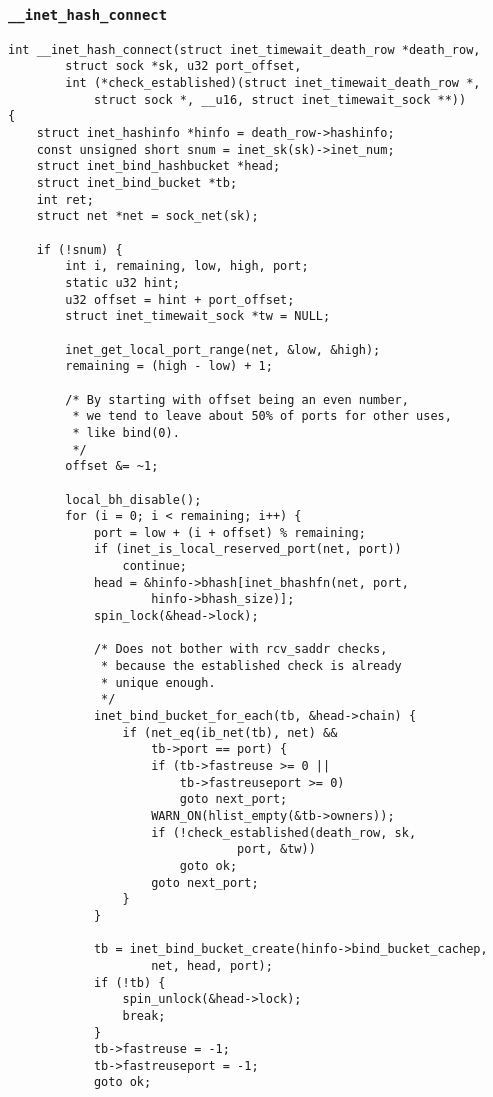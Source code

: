         \subsubsection{\texttt{__inet_hash_connect}}     
\begin{verbatim}
int __inet_hash_connect(struct inet_timewait_death_row *death_row,
        struct sock *sk, u32 port_offset,
        int (*check_established)(struct inet_timewait_death_row *,
            struct sock *, __u16, struct inet_timewait_sock **))
{
    struct inet_hashinfo *hinfo = death_row->hashinfo;
    const unsigned short snum = inet_sk(sk)->inet_num;
    struct inet_bind_hashbucket *head;
    struct inet_bind_bucket *tb;
    int ret;
    struct net *net = sock_net(sk);

    if (!snum) {
        int i, remaining, low, high, port;
        static u32 hint;
        u32 offset = hint + port_offset;
        struct inet_timewait_sock *tw = NULL;

        inet_get_local_port_range(net, &low, &high);
        remaining = (high - low) + 1;

        /* By starting with offset being an even number,
         * we tend to leave about 50% of ports for other uses,
         * like bind(0).
         */
        offset &= ~1;

        local_bh_disable();
        for (i = 0; i < remaining; i++) {
            port = low + (i + offset) % remaining;
            if (inet_is_local_reserved_port(net, port))
                continue;
            head = &hinfo->bhash[inet_bhashfn(net, port,
                    hinfo->bhash_size)];
            spin_lock(&head->lock);

            /* Does not bother with rcv_saddr checks,
             * because the established check is already
             * unique enough.
             */
            inet_bind_bucket_for_each(tb, &head->chain) {
                if (net_eq(ib_net(tb), net) &&
                    tb->port == port) {
                    if (tb->fastreuse >= 0 ||
                        tb->fastreuseport >= 0)
                        goto next_port;
                    WARN_ON(hlist_empty(&tb->owners));
                    if (!check_established(death_row, sk,
                                port, &tw))
                        goto ok;
                    goto next_port;
                }
            }

            tb = inet_bind_bucket_create(hinfo->bind_bucket_cachep,
                    net, head, port);
            if (!tb) {
                spin_unlock(&head->lock);
                break;
            }
            tb->fastreuse = -1;
            tb->fastreuseport = -1;
            goto ok;


\end{verbatim}

